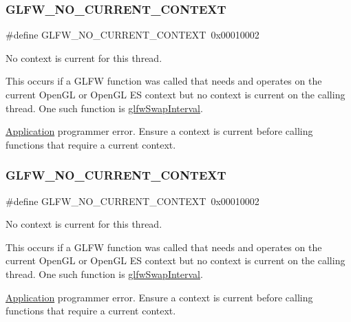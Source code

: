 \subsubsection{\texorpdfstring{G\+L\+F\+W\+\_\+\+N\+O\+\_\+\+C\+U\+R\+R\+E\+N\+T\+\_\+\+C\+O\+N\+T\+E\+XT}{GLFW\_NO\_CURRENT\_CONTEXT}\hspace{0.1cm}{\footnotesize\ttfamily [2/5]}}
{\footnotesize\ttfamily \#define G\+L\+F\+W\+\_\+\+N\+O\+\_\+\+C\+U\+R\+R\+E\+N\+T\+\_\+\+C\+O\+N\+T\+E\+XT~0x00010002}



No context is current for this thread. 

This occurs if a G\+L\+FW function was called that needs and operates on the current Open\+GL or Open\+GL ES context but no context is current on the calling thread. One such function is \hyperlink{group__context_ga12a595c06947cec4967c6e1f14210a8a}{glfw\+Swap\+Interval}.

\hyperlink{classApplication}{Application} programmer error. Ensure a context is current before calling functions that require a current context. \mbox{\label{group__errors_gaa8290386e9528ccb9e42a3a4e16fc0d0}} 
\subsubsection{\texorpdfstring{G\+L\+F\+W\+\_\+\+N\+O\+\_\+\+C\+U\+R\+R\+E\+N\+T\+\_\+\+C\+O\+N\+T\+E\+XT}{GLFW\_NO\_CURRENT\_CONTEXT}\hspace{0.1cm}{\footnotesize\ttfamily [3/5]}}
{\footnotesize\ttfamily \#define G\+L\+F\+W\+\_\+\+N\+O\+\_\+\+C\+U\+R\+R\+E\+N\+T\+\_\+\+C\+O\+N\+T\+E\+XT~0x00010002}



No context is current for this thread. 

This occurs if a G\+L\+FW function was called that needs and operates on the current Open\+GL or Open\+GL ES context but no context is current on the calling thread. One such function is \hyperlink{group__context_ga12a595c06947cec4967c6e1f14210a8a}{glfw\+Swap\+Interval}.

\hyperlink{classApplication}{Application} programmer error. Ensure a context is current before calling functions that require a current context. \mbox{\label{group__errors_gaa8290386e9528ccb9e42a3a4e16fc0d0}} 
